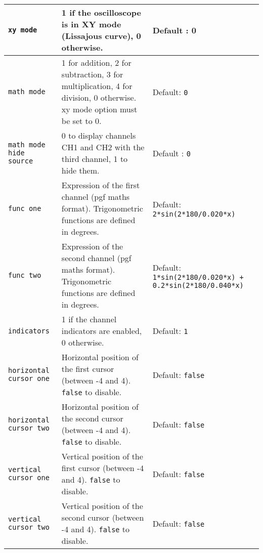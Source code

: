 \documentclass[11pt,a4paper,usenames,dvipsnames]{article}
\begin{document}
\begin{tcolorbox}[enhanced,breakable,colback=white,colframe=black,width=\textwidth,left=0mm,right=0mm,top=0mm,bottom=0mm,boxsep=0mm]
\begin{tabular}{p{}|p{}|p{}}
        \texttt{xy mode}               & 1 if the oscilloscope is in XY mode (Lissajous curve), 0 otherwise.                                                    & Default : 0                                                     \\\hline
        \texttt{math mode}             & 1 for addition, 2 for subtraction, 3 for multiplication, 4 for division, 0 otherwise. xy mode option must be set to 0. & Default: \texttt{0}                                             \\\hline
        \texttt{math mode hide source} & 0 to display channels CH1 and CH2 with the third channel, 1 to hide them.                                              & Default : \texttt{0}                                            \\\hline
        \texttt{func one}              & Expression of the first channel (pgf maths format). Trigonometric functions are defined in degrees.                    & Default: \texttt{2*sin(2*180/0.020*x)}                          \\\hline
        \texttt{func two}              & Expression of the second channel (pgf maths format). Trigonometric functions are defined in degrees.                   & Default: \texttt{1*sin(2*180/0.020*x) + 0.2*sin(2*180/0.040*x)} \\\hline
        \texttt{indicators}            & 1 if the channel indicators are enabled, 0 otherwise.                                                                  & Default: \texttt{1}                                             \\\hline
        \texttt{horizontal cursor one} & Horizontal position of the first cursor (between -4 and 4). \texttt{false} to disable.                                 & Default: \texttt{false}                                         \\\hline
        \texttt{horizontal cursor two} & Horizontal position of the second cursor (between -4 and 4). \texttt{false} to disable.                                & Default: \texttt{false}                                         \\\hline
        \texttt{vertical cursor one}   & Vertical position of the first cursor (between -4 and 4). \texttt{false} to disable.                                   & Default: \texttt{false}                                         \\\hline
        \texttt{vertical cursor two}   & Vertical position of the second cursor (between -4 and 4). \texttt{false} to disable.                                  & Default: \texttt{false}                                         \\\hline

\end{tabular}
\end{tcolorbox}
\end{document}
